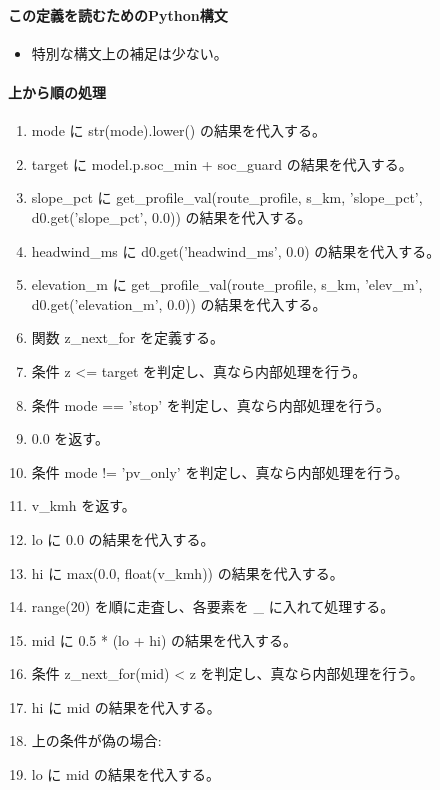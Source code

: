 \documentclass[a4paper,11pt]{article}
\begin{document}
            \paragraph{この定義を読むためのPython構文}
            \begin{itemize}[leftmargin=1.6em]
            \item 特別な構文上の補足は少ない。
            \end{itemize}
            \paragraph{上から順の処理}
            \begin{enumerate}[leftmargin=1.8em]
            \item mode に str(mode).lower() の結果を代入する。
\item target に model.p.soc\_min + soc\_guard の結果を代入する。
\item slope\_pct に get\_profile\_val(route\_profile, s\_km, 'slope\_pct', d0.get('slope\_pct', 0.0)) の結果を代入する。
\item headwind\_ms に d0.get('headwind\_ms', 0.0) の結果を代入する。
\item elevation\_m に get\_profile\_val(route\_profile, s\_km, 'elev\_m', d0.get('elevation\_m', 0.0)) の結果を代入する。
\item 関数 z\_next\_for を定義する。
\item 条件 z <= target を判定し、真なら内部処理を行う。
\item   条件 mode == 'stop' を判定し、真なら内部処理を行う。
\item     0.0 を返す。
\item   条件 mode != 'pv\_only' を判定し、真なら内部処理を行う。
\item     v\_kmh を返す。
\item   lo に 0.0 の結果を代入する。
\item   hi に max(0.0, float(v\_kmh)) の結果を代入する。
\item   range(20) を順に走査し、各要素を \_ に入れて処理する。
\item     mid に 0.5 * (lo + hi) の結果を代入する。
\item     条件 z\_next\_for(mid) < z を判定し、真なら内部処理を行う。
\item       hi に mid の結果を代入する。
\item       上の条件が偽の場合:
\item       lo に mid の結果を代入する。

\end{enumerate}
\end{document}
